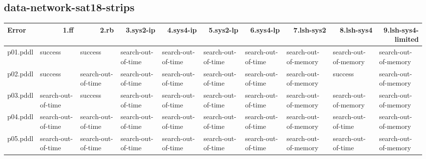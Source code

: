 \documentclass{article}
\begin{document}
\hypertarget{error-data-network-sat18-strips}{}
\subsection*{data-network-sat18-strips}

\begin{tabular}{@{}lrrrrrrrrr@{}}
Error & 1.ff & 2.rb & 3.sys2-ip & 4.sys4-ip & 5.sys2-lp & 6.sys4-lp & 7.lsh-sys2 & 8.lsh-sys4 & 9.lsh-sys4-limited \\
\midrule
p01.pddl & \multicolumn{1}{|l|}{success} & \multicolumn{1}{|l|}{success} & \multicolumn{1}{|l|}{search-out-of-time} & \multicolumn{1}{|l|}{search-out-of-time} & \multicolumn{1}{|l|}{search-out-of-time} & \multicolumn{1}{|l|}{search-out-of-time} & \multicolumn{1}{|l|}{search-out-of-memory} & \multicolumn{1}{|l|}{search-out-of-memory} & \multicolumn{1}{|l|}{search-out-of-memory} \\
p02.pddl & \multicolumn{1}{|l|}{success} & \multicolumn{1}{|l|}{search-out-of-time} & \multicolumn{1}{|l|}{search-out-of-time} & \multicolumn{1}{|l|}{search-out-of-time} & \multicolumn{1}{|l|}{search-out-of-time} & \multicolumn{1}{|l|}{search-out-of-time} & \multicolumn{1}{|l|}{search-out-of-memory} & \multicolumn{1}{|l|}{success} & \multicolumn{1}{|l|}{search-out-of-memory} \\
p03.pddl & \multicolumn{1}{|l|}{search-out-of-time} & \multicolumn{1}{|l|}{success} & \multicolumn{1}{|l|}{search-out-of-time} & \multicolumn{1}{|l|}{search-out-of-time} & \multicolumn{1}{|l|}{search-out-of-time} & \multicolumn{1}{|l|}{search-out-of-time} & \multicolumn{1}{|l|}{search-out-of-memory} & \multicolumn{1}{|l|}{search-out-of-memory} & \multicolumn{1}{|l|}{search-out-of-memory} \\
p04.pddl & \multicolumn{1}{|l|}{search-out-of-time} & \multicolumn{1}{|l|}{search-out-of-time} & \multicolumn{1}{|l|}{search-out-of-time} & \multicolumn{1}{|l|}{search-out-of-time} & \multicolumn{1}{|l|}{search-out-of-time} & \multicolumn{1}{|l|}{search-out-of-time} & \multicolumn{1}{|l|}{search-out-of-memory} & \multicolumn{1}{|l|}{search-out-of-time} & \multicolumn{1}{|l|}{search-out-of-memory} \\
p05.pddl & \multicolumn{1}{|l|}{search-out-of-time} & \multicolumn{1}{|l|}{search-out-of-time} & \multicolumn{1}{|l|}{search-out-of-time} & \multicolumn{1}{|l|}{search-out-of-time} & \multicolumn{1}{|l|}{search-out-of-time} & \multicolumn{1}{|l|}{search-out-of-time} & \multicolumn{1}{|l|}{search-out-of-memory} & \multicolumn{1}{|l|}{search-out-of-time} & \multicolumn{1}{|l|}{search-out-of-memory} \\

\end{tabular}
\end{document}
